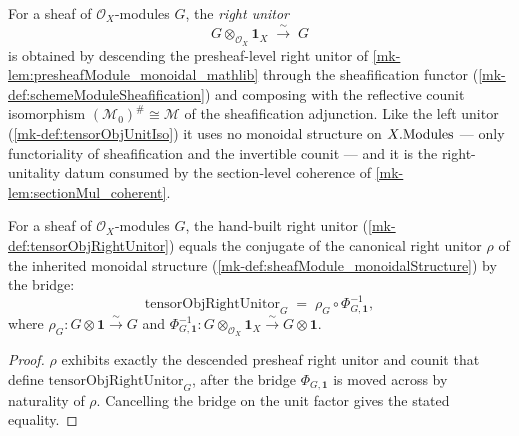 \begin{definition}\label{mk-def:tensorObjRightUnitor}
  \leanok

  For a sheaf of \(\mathcal{O}_X\)-modules \(G\), the \emph{right unitor}
  \[
    G \otimes_{\mathcal{O}_X} \mathbf{1}_X \;\xrightarrow{\ \sim\ }\; G
  \]
  is obtained by descending the presheaf-level right unitor of
  \ref{mk-lem:presheafModule_monoidal_mathlib} through the sheafification functor
  (\ref{mk-def:schemeModuleSheafification}) and composing with the reflective counit
  isomorphism \((\mathcal{M}_0)^{\#} \cong \mathcal{M}\) of the sheafification
  adjunction. Like the left unitor (\ref{mk-def:tensorObjUnitIso}) it uses no
  monoidal structure on \(X.\mathrm{Modules}\) --- only functoriality of sheafification
  and the invertible counit --- and it is the right-unitality datum consumed by
  the section-level coherence of \ref{mk-lem:sectionMul_coherent}.
\end{definition}

\begin{lemma}\label{mk-lem:tensorObjRightUnitor_eq}
  \leanok

  For a sheaf of \(\mathcal{O}_X\)-modules \(G\), the hand-built right unitor
  (\ref{mk-def:tensorObjRightUnitor}) equals the conjugate of the canonical right
  unitor \(\rho\) of the inherited monoidal structure
  (\ref{mk-def:sheafModule_monoidalStructure}) by the bridge:
  \[
    \mathrm{tensorObjRightUnitor}_G
      \;=\; \rho_G \circ \Phi_{G,\mathbf{1}}^{-1},
  \]
  where \(\rho_G : G \otimes \mathbf{1} \xrightarrow{\sim} G\) and
  \(\Phi_{G,\mathbf{1}}^{-1} : G \otimes_{\mathcal{O}_X} \mathbf{1}_X
  \xrightarrow{\sim} G \otimes \mathbf{1}\).
\end{lemma}

\begin{proof}
  \(\rho\) exhibits exactly the descended presheaf right unitor and counit that
  define \(\mathrm{tensorObjRightUnitor}_G\), after the bridge
  \(\Phi_{G,\mathbf{1}}\) is moved across by naturality of \(\rho\). Cancelling the
  bridge on the unit factor gives the stated equality.
\end{proof}

